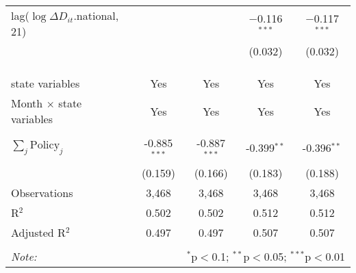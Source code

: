 \begin{tabular}{@{\extracolsep{1pt}}lcccc}
  lag($\log \Delta D_{it}$.national, 21) &  &  & $-$0.116$^{***}$ & $-$0.117$^{***}$ \\ 
  &  &  & (0.032) & (0.032) \\ 
   &  &  &  &  \\ 
  &  &  &  &  \\ 
 \hline \\[-1.8ex] 
state variables & Yes & Yes & Yes & Yes \\ 
Month $\times$ state variables & Yes & Yes & Yes & Yes \\ 
\hline \\[-1.8ex] 
$\sum_j \mathrm{Policy}_j$ & -0.885$^{***}$ & -0.887$^{***}$ & -0.399$^{**}$ & -0.396$^{**}$ \\ 
 & (0.159) & (0.166) & (0.183) & (0.188) \\ 
Observations & 3,468 & 3,468 & 3,468 & 3,468 \\ 
R$^{2}$ & 0.502 & 0.502 & 0.512 & 0.512 \\ 
Adjusted R$^{2}$ & 0.497 & 0.497 & 0.507 & 0.507 \\ 
\hline 
\hline \\[-1.8ex] 
\textit{Note:}  & \multicolumn{4}{r}{$^{*}$p$<$0.1; $^{**}$p$<$0.05; $^{***}$p$<$0.01} \\ 
\end{tabular} 